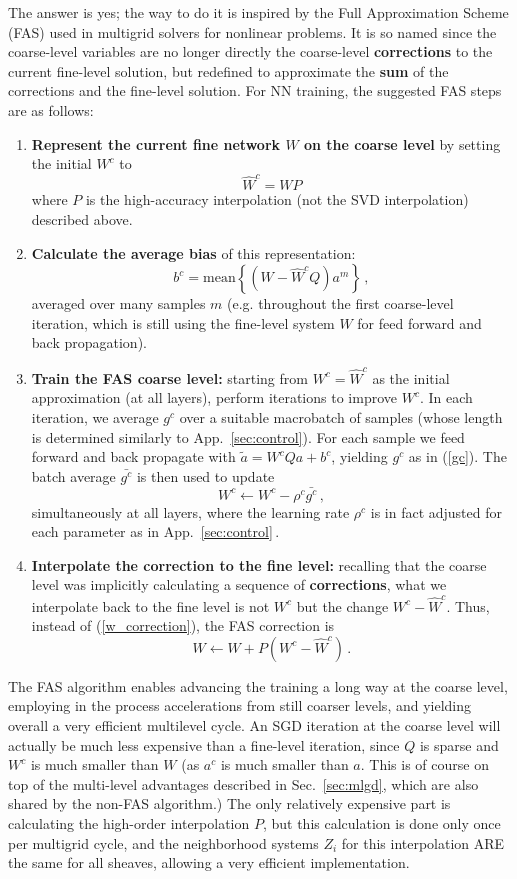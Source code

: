 \documentclass{article} %
\begin{document}
The answer is yes; the way to do it is inspired by the Full Approximation Scheme (FAS) used in multigrid solvers for nonlinear problems. It is so named since the coarse-level variables are no longer directly the coarse-level \textbf{corrections} to the current fine-level solution, but redefined to approximate the \textbf{sum} of the corrections and the fine-level solution. For NN training, the suggested FAS steps are as follows:
\begin{enumerate}
	\item \textbf{Represent the current fine network $W$ on the coarse level} by setting the initial $W^c$ to
	$$ \hat{W}^c = W P $$
where $P$ is the high-accuracy interpolation (not the SVD interpolation) described above.
	\item \textbf{Calculate the average bias} of this representation:
	$$ b^c = {\mbox{mean}}\left\{ \left( W - \hat{W}^c Q \right) a^m \right\}\,, $$
averaged over many samples $m$ (e.g. throughout the first coarse-level iteration, which is still using the fine-level system $W$ for feed forward and back propagation).
	\item \textbf{Train the FAS coarse level:} starting from $W^c = \hat{W}^c$ as the initial approximation (at all layers), perform iterations to improve $W^c$. In each iteration, we average $g^c$ over a suitable macrobatch of samples (whose length is determined similarly to App.~\ref{sec:control}). For each sample we feed forward and back propagate with $\tilde{a} = W^c Q a + b^c$, yielding $g^c$ as in (\ref{gc}). The batch average $\bar{g^c}$ is then used to update
	$$ W^c \longleftarrow W^c - \rho^c \bar{g^c}\,, $$
	simultaneously at all layers, where the learning rate $\rho^c$ is in fact adjusted for each parameter as in App.~\ref{sec:control}\,.
	\item \textbf{Interpolate the correction to the fine level:} recalling that the coarse level was implicitly calculating a sequence of \textbf{corrections}, what we interpolate back to the fine level is not $W^c$ but the change $W^c - \hat{W}^c$. Thus, instead of (\ref{w_correction}), the FAS correction is
	$$ W \longleftarrow W + P \left( W^c - \hat{W}^c \right)\,. $$
\end{enumerate}

The FAS algorithm enables advancing the training a long way at the coarse level, employing in the process accelerations from still coarser levels, and yielding overall a very efficient multilevel cycle. An SGD iteration at the coarse level will actually be much less expensive than a fine-level iteration, since $Q$ is sparse and $W^c$ is much smaller than $W$ (as $a^c$ is much smaller than $a$. This is of course on top of the multi-level advantages described in Sec.~\ref{sec:mlgd}, which are also shared by the non-FAS algorithm.) The only relatively expensive part is calculating the high-order interpolation $P$, but this calculation is done only once per multigrid cycle, and the neighborhood systems $Z_i$ for this interpolation ARE the same for all sheaves, allowing a very efficient implementation.
\end{document}

